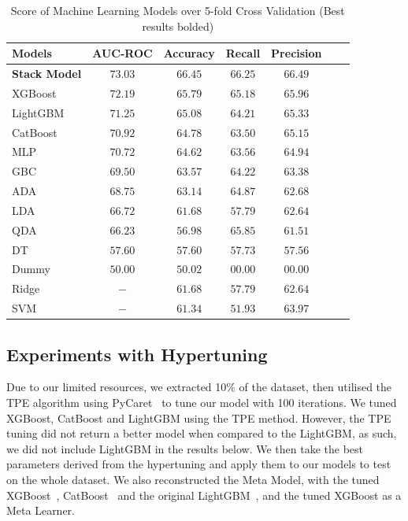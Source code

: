\documentclass[pdflatex,sn-basic,Numbered]{sn-jnl}%
\theoremstyle{thmstyleone}%
\theoremstyle{thmstyletwo}%
\theoremstyle{thmstylethree}%
\begin{document}
\begin{table}
\centering
\caption{Score of Machine Learning Models over 5-fold Cross Validation (Best results bolded)}
\label{tab:allaimodels}
\begin{tabular}{@{}lcccccc@{}}
\toprule
 \textbf{Models} & \textbf{AUC-ROC} & \textbf{Accuracy} & \textbf{Recall}  & \textbf{Precision} \\ \midrule
 \textbf{Stack Model} & $\mathbf{73.03}$ & $\mathbf{66.45}$ & $\mathbf{66.25}$ & $\mathbf{66.49}$ \\ 
XGBoost & $72.19$ & $65.79$ & $65.18$ & $65.96$ \\
LightGBM & $71.25$ & $65.08$ & $64.21$ & $65.33$ \\ 
CatBoost & $70.92$ & $64.78$ & $63.50$ & $65.15$ \\ 
MLP & $70.72$ & $64.62 $ & $63.56$ & $64.94$ \\ 
GBC & $69.50$ & $63.57 $ & $64.22$ & $63.38$ \\ 
ADA & $68.75$ & $63.14$ & $64.87$ & $62.68$ \\ 
LDA & $66.72$ & $61.68$ & $57.79$ & $62.64$ \\ 
QDA & $66.23$ & $56.98$ & $65.85$ & $61.51$ \\ 
DT & $57.60$ & $57.60$ & $57.73$ & $57.56$ \\ 
Dummy & $50.00$ & $50.02$ & $00.00$ & $00.00$ \\ 
Ridge & $-$ & $61.68$ & $57.79$ & $62.64$ \\
SVM & $-$ & $61.34$ & $51.93$ & $63.97$ \\ \bottomrule
\end{tabular}%
\vspace{-1ex}
\end{table}

\subsection{Experiments with Hypertuning}\label{subsec:experiments-with-hypertuning}
Due to our limited resources, we extracted 10\% of the dataset, then utilised the TPE algorithm using PyCaret~\cite{pycaret} to tune our model with 100 iterations.
We tuned XGBoost, CatBoost and LightGBM using the TPE method.
However, the TPE tuning did not return a better model when compared to the LightGBM, as such, we did not include LightGBM in the results below.
We then take the best parameters derived from the hypertuning and apply them to our models to test on the whole dataset.
We also reconstructed the Meta Model, with the tuned XGBoost~\cite{Chen:2016:XST:2939672.2939785}, CatBoost~\cite{cat} and the original LightGBM~\cite{ke2017lightgbm}, and the tuned XGBoost as a Meta Learner.
\end{document}
